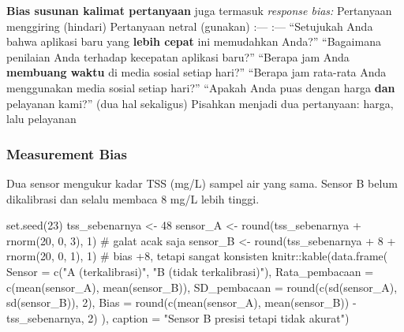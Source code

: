 \documentclass[
  indonesian,
  letterpaper,
]{book}
\newenvironment{Shaded}{\begin{snugshade}}{\end{snugshade}}
\newcommand{\AttributeTok}[1]{\textcolor[rgb]{0.40,0.45,0.13}{#1}}
\newcommand{\CommentTok}[1]{\textcolor[rgb]{0.37,0.37,0.37}{#1}}
\newcommand{\DecValTok}[1]{\textcolor[rgb]{0.68,0.00,0.00}{#1}}
\newcommand{\FunctionTok}[1]{\textcolor[rgb]{0.28,0.35,0.67}{#1}}
\newcommand{\NormalTok}[1]{\textcolor[rgb]{0.00,0.23,0.31}{#1}}
\newcommand{\OtherTok}[1]{\textcolor[rgb]{0.00,0.23,0.31}{#1}}
\newcommand{\SpecialCharTok}[1]{\textcolor[rgb]{0.37,0.37,0.37}{#1}}
\newcommand{\StringTok}[1]{\textcolor[rgb]{0.13,0.47,0.30}{#1}}
\begin{document}
\textbf{Bias susunan kalimat pertanyaan} juga termasuk \emph{response
bias:} \textbar{} Pertanyaan menggiring (hindari) \textbar{} Pertanyaan
netral (gunakan) \textbar{} \textbar{} :--- \textbar{} :--- \textbar{}
\textbar{} ``Setujukah Anda bahwa aplikasi baru yang \textbf{lebih
cepat} ini memudahkan Anda?'' \textbar{} ``Bagaimana penilaian Anda
terhadap kecepatan aplikasi baru?'' \textbar{} \textbar{} ``Berapa jam
Anda \textbf{membuang waktu} di media sosial setiap hari?'' \textbar{}
``Berapa jam rata-rata Anda menggunakan media sosial setiap hari?''
\textbar{} \textbar{} ``Apakah Anda puas dengan harga \textbf{dan}
pelayanan kami?'' (dua hal sekaligus) \textbar{} Pisahkan menjadi dua
pertanyaan: harga, lalu pelayanan \textbar{}

\subsubsection{Measurement Bias}\label{measurement-bias}

Dua sensor mengukur kadar TSS (mg/L) sampel air yang sama. Sensor B
belum dikalibrasi dan selalu membaca 8 mg/L lebih tinggi.

\begin{Shaded}
\begin{Highlighting}[]
\FunctionTok{set.seed}\NormalTok{(}\DecValTok{23}\NormalTok{)}
\NormalTok{tss\_sebenarnya }\OtherTok{\textless{}{-}} \DecValTok{48}
\NormalTok{sensor\_A }\OtherTok{\textless{}{-}} \FunctionTok{round}\NormalTok{(tss\_sebenarnya }\SpecialCharTok{+} \FunctionTok{rnorm}\NormalTok{(}\DecValTok{20}\NormalTok{, }\DecValTok{0}\NormalTok{, }\DecValTok{3}\NormalTok{), }\DecValTok{1}\NormalTok{) }\CommentTok{\# galat acak saja}
\NormalTok{sensor\_B }\OtherTok{\textless{}{-}} \FunctionTok{round}\NormalTok{(tss\_sebenarnya }\SpecialCharTok{+} \DecValTok{8} \SpecialCharTok{+} \FunctionTok{rnorm}\NormalTok{(}\DecValTok{20}\NormalTok{, }\DecValTok{0}\NormalTok{, }\DecValTok{1}\NormalTok{), }\DecValTok{1}\NormalTok{) }\CommentTok{\# bias +8, tetapi sangat konsisten}
\NormalTok{knitr}\SpecialCharTok{::}\FunctionTok{kable}\NormalTok{(}\FunctionTok{data.frame}\NormalTok{(}
\AttributeTok{Sensor =} \FunctionTok{c}\NormalTok{(}\StringTok{"A (terkalibrasi)"}\NormalTok{, }\StringTok{"B (tidak terkalibrasi)"}\NormalTok{),}
\AttributeTok{Rata\_pembacaan =} \FunctionTok{c}\NormalTok{(}\FunctionTok{mean}\NormalTok{(sensor\_A), }\FunctionTok{mean}\NormalTok{(sensor\_B)),}
\AttributeTok{SD\_pembacaan =} \FunctionTok{round}\NormalTok{(}\FunctionTok{c}\NormalTok{(}\FunctionTok{sd}\NormalTok{(sensor\_A), }\FunctionTok{sd}\NormalTok{(sensor\_B)), }\DecValTok{2}\NormalTok{),}
\AttributeTok{Bias =} \FunctionTok{round}\NormalTok{(}\FunctionTok{c}\NormalTok{(}\FunctionTok{mean}\NormalTok{(sensor\_A), }\FunctionTok{mean}\NormalTok{(sensor\_B)) }\SpecialCharTok{{-}}\NormalTok{ tss\_sebenarnya, }\DecValTok{2}\NormalTok{)}
\NormalTok{), }\AttributeTok{caption =} \StringTok{"Sensor B presisi tetapi tidak akurat"}\NormalTok{)}
\end{Highlighting}
\end{Shaded}
\end{document}
